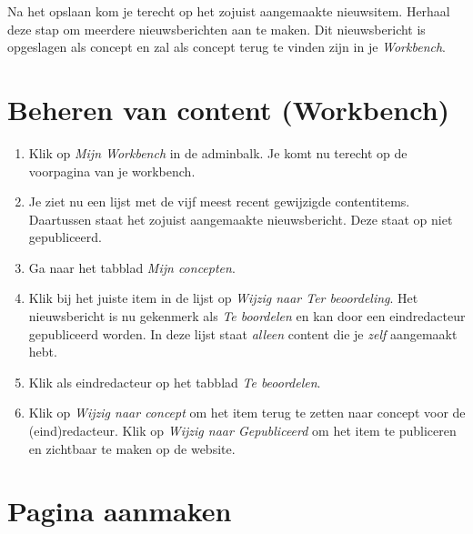 Na het opslaan kom je terecht op het zojuist aangemaakte nieuwsitem. Herhaal deze stap om meerdere nieuwsberichten aan te maken. Dit nieuwsbericht is opgeslagen als concept en zal als concept terug te vinden zijn in je \emph{Workbench}.

\section{Beheren van content (Workbench)}

\begin{enumerate}
\item Klik op \emph{Mijn Workbench} in de adminbalk. Je komt nu terecht op de voorpagina van je workbench.

\begin{center}
\end{center}

\item Je ziet nu een lijst met de vijf meest recent gewijzigde contentitems. Daartussen staat het zojuist aangemaakte nieuwsbericht. Deze staat op niet gepubliceerd.
\item Ga naar het tabblad \emph{Mijn concepten}.
\item Klik bij het juiste item in de lijst op \emph{Wijzig naar Ter beoordeling}. Het nieuwsbericht is nu gekenmerk als \emph{Te boordelen} en kan door een eindredacteur gepubliceerd worden. In deze lijst staat \emph{alleen} content die je \emph{zelf} aangemaakt hebt. 
\item Klik als eindredacteur op het tabblad \emph{Te beoordelen}.
\item Klik op \emph{Wijzig naar concept} om het item terug te zetten naar concept voor de (eind)redacteur. Klik op \emph{Wijzig naar Gepubliceerd} om het item te publiceren en zichtbaar te maken op de website.
\end{enumerate}

\section{Pagina aanmaken}\label{nieuwepagina}

